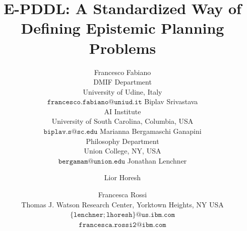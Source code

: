 \documentclass[letterpaper]{article}
\newcommand{\mymail}[1]{\ensuremath{\mathtt{#1}}}
\theoremstyle{definition}
\begin{document}
%
\title{E-PDDL: A Standardized Way of Defining Epistemic Planning Problems}

\author{Francesco Fabiano\\DMIF Department\\ University of Udine, Italy \\ \mymail{francesco.fabiano@uniud.it}
\And Biplav Srivastava\\AI Institute \\ University of South Carolina, Columbia, USA \\ \mymail{biplav.s@sc.edu}
\And Marianna Bergamaschi Ganapini\\ Philosophy Department\\Union College, NY, USA \\ \mymail{bergamam@union.edu} 
\AND Jonathan Lenchner \and Lior Horesh \and Francesca Rossi\\Thomas J. Watson Research Center, Yorktown Heights, NY USA \\ \mymail{\{lenchner;lhoresh\}@us.ibm.com} \\\mymail{francesca.rossi2@ibm.com}
}

\maketitle
\begin{abstract}
\begin{quote}



\end{quote}
\end{abstract}










\end{document}
